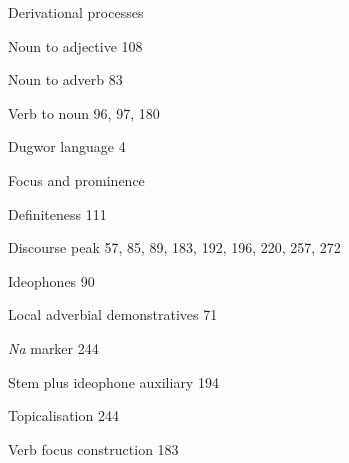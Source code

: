 \begin{multicols}{2}
\begin{styleindexi}
Derivational processes
\end{styleindexi}

\begin{styleindexii}
Noun to adjective  108
\end{styleindexii}

\begin{styleindexii}
Noun to adverb  83
\end{styleindexii}

\begin{styleindexii}
Verb to noun  96, 97, 180
\end{styleindexii}

\begin{styleindexi}
Dugwor language  4
\end{styleindexi}

\begin{styleindexi}
Focus and prominence
\end{styleindexi}

\begin{styleindexii}
Definiteness  111
\end{styleindexii}

\begin{styleindexii}
Discourse peak  57, 85, 89, 183, 192, 196, 220, 257, 272
\end{styleindexii}

\begin{styleindexii}
Ideophones  90
\end{styleindexii}

\begin{styleindexii}
Local adverbial demonstratives  71
\end{styleindexii}

\begin{styleindexii}
\textit{Na} marker  244
\end{styleindexii}

\begin{styleindexii}
Stem plus ideophone auxiliary  194
\end{styleindexii}

\begin{styleindexii}
Topicalisation  244
\end{styleindexii}

\begin{styleindexii}
Verb focus construction  183
\end{styleindexii}


\end{multicols}
